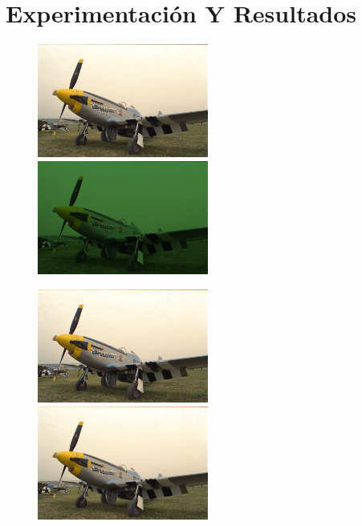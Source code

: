 \section{Experimentación Y Resultados}

\begin{figure}[h!]

       \includegraphics[width=0.5\textwidth]{imagenes/img9.png}
           \hfill
        \includegraphics[width=0.5\textwidth]{imagenes/img9_bayer.png}

\end{figure}

\begin{figure}[h!]

       \includegraphics[width=0.5\textwidth]{imagenes/img9_demosicing_vecino.png}
           \hfill
        \includegraphics[width=0.5\textwidth]{imagenes/img9_demosicing_bilineal.png}

\end{figure}


